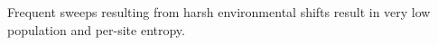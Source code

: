 Frequent sweeps resulting from harsh environmental shifts result in very low population and per-site entropy.